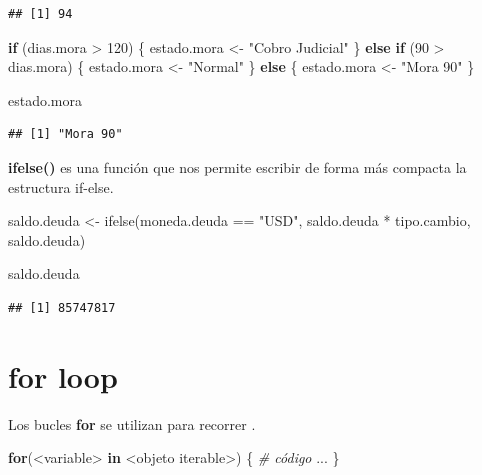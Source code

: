 \documentclass[
  12pt,
]{book}
\newenvironment{Shaded}{\begin{snugshade}}{\end{snugshade}}
\newcommand{\CommentTok}[1]{\textcolor[rgb]{0.56,0.35,0.01}{\textit{#1}}}
\newcommand{\ControlFlowTok}[1]{\textcolor[rgb]{0.13,0.29,0.53}{\textbf{#1}}}
\newcommand{\DecValTok}[1]{\textcolor[rgb]{0.00,0.00,0.81}{#1}}
\newcommand{\FunctionTok}[1]{\textcolor[rgb]{0.00,0.00,0.00}{#1}}
\newcommand{\NormalTok}[1]{#1}
\newcommand{\OtherTok}[1]{\textcolor[rgb]{0.56,0.35,0.01}{#1}}
\newcommand{\SpecialCharTok}[1]{\textcolor[rgb]{0.00,0.00,0.00}{#1}}
\newcommand{\StringTok}[1]{\textcolor[rgb]{0.31,0.60,0.02}{#1}}
\begin{document}
\begin{verbatim}
## [1] 94
\end{verbatim}

\begin{Shaded}
\begin{Highlighting}[]
\ControlFlowTok{if}\NormalTok{ (dias.mora }\SpecialCharTok{\textgreater{}} \DecValTok{120}\NormalTok{) \{}
\NormalTok{  estado.mora }\OtherTok{\textless{}{-}} \StringTok{"Cobro Judicial"}
\NormalTok{\} }\ControlFlowTok{else} \ControlFlowTok{if}\NormalTok{ (}\DecValTok{90} \SpecialCharTok{\textgreater{}}\NormalTok{ dias.mora) \{}
\NormalTok{  estado.mora }\OtherTok{\textless{}{-}} \StringTok{"Normal"}
\NormalTok{\} }\ControlFlowTok{else}\NormalTok{ \{}
\NormalTok{  estado.mora }\OtherTok{\textless{}{-}} \StringTok{"Mora 90"}
\NormalTok{\}}

\NormalTok{estado.mora}
\end{Highlighting}
\end{Shaded}

\begin{verbatim}
## [1] "Mora 90"
\end{verbatim}

\textbf{ifelse()} es una función que nos permite escribir de forma más compacta la estructura if-else.

\begin{Shaded}
\begin{Highlighting}[]
\NormalTok{saldo.deuda }\OtherTok{\textless{}{-}} \FunctionTok{ifelse}\NormalTok{(moneda.deuda }\SpecialCharTok{==} \StringTok{"USD"}\NormalTok{, saldo.deuda }\SpecialCharTok{*}\NormalTok{ tipo.cambio, saldo.deuda)}

\NormalTok{saldo.deuda}
\end{Highlighting}
\end{Shaded}

\begin{verbatim}
## [1] 85747817
\end{verbatim}

\hypertarget{for-loop}{%
\section{\texorpdfstring{\textbf{for loop}}{for loop}}\label{for-loop}}

Los bucles \textbf{for} se utilizan para recorrer .

\begin{Shaded}
\begin{Highlighting}[]
\ControlFlowTok{for}\NormalTok{(}\SpecialCharTok{\textless{}}\NormalTok{variable}\SpecialCharTok{\textgreater{}} \ControlFlowTok{in} \SpecialCharTok{\textless{}}\NormalTok{objeto iterable}\SpecialCharTok{\textgreater{}}\NormalTok{) \{}
  \CommentTok{\# código}
\NormalTok{  ...}
\NormalTok{\}}
\end{Highlighting}
\end{Shaded}
\end{document}
